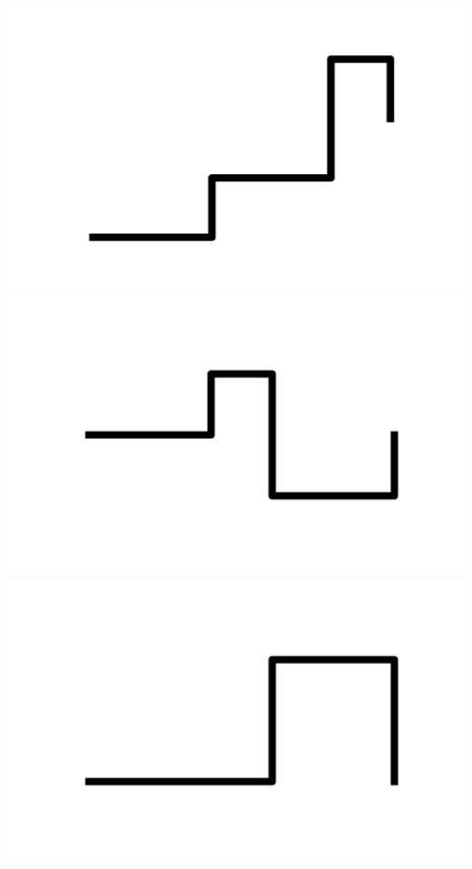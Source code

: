 \documentclass[]{report}
\begin{document}
\includegraphics[scale=.1]{pictures/21/state_cluster_shapes_472.pdf} 
\includegraphics[scale=.1]{pictures/21/state_cluster_shapes_473.pdf} 
\includegraphics[scale=.1]{pictures/21/state_cluster_shapes_474.pdf} 
\end{document}
